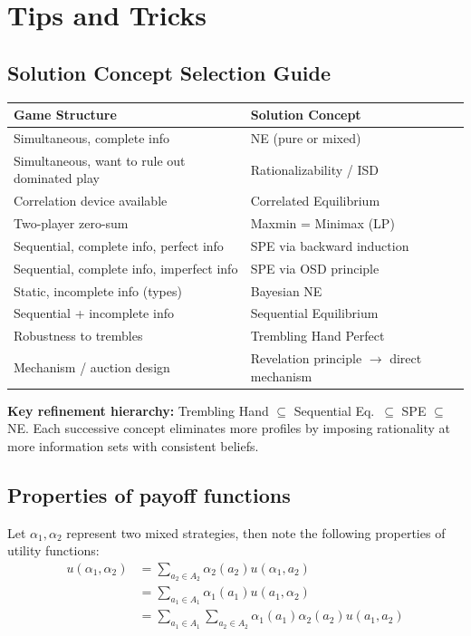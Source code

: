 \section{Tips and Tricks}

\subsection{Solution Concept Selection Guide}
\begin{center}
\begin{tabular}{@{}p{3.8cm}|p{4.5cm}@{}}
\textbf{Game Structure} & \textbf{Solution Concept} \\ \hline
Simultaneous, complete info & NE (pure or mixed) \\
Simultaneous, want to rule out dominated play & Rationalizability / ISD \\
Correlation device available & Correlated Equilibrium \\
Two-player zero-sum & Maxmin = Minimax (LP) \\
Sequential, complete info, perfect info & SPE via backward induction \\
Sequential, complete info, imperfect info & SPE via OSD principle \\
Static, incomplete info (types) & Bayesian NE \\
Sequential + incomplete info & Sequential Equilibrium \\
Robustness to trembles & Trembling Hand Perfect \\
Mechanism / auction design & Revelation principle $\to$ direct mechanism 
\end{tabular}
\end{center}

\textbf{Key refinement hierarchy:} Trembling Hand $\subseteq$ Sequential Eq.\ $\subseteq$ SPE $\subseteq$ NE. Each successive concept eliminates more profiles by imposing rationality at more information sets with consistent beliefs.

\subsection{Properties of payoff functions}
Let $\alpha_1, \alpha_2$ represent two mixed strategies, then note the following properties of utility functions:
\begin{align*}
    u(\alpha_1,\alpha_2)&=\sum_{a_2 \in A_2} \alpha_2(a_2) u(\alpha_1,a_2) \\ &=\sum_{a_1 \in A_1} \alpha_1(a_1) u(a_1,\alpha_2) \\
    &=\sum_{a_1 \in A_1} \sum_{a_2 \in A_2} \alpha_1(a_1) \alpha_2(a_2) u(a_1,a_2)
\end{align*}
